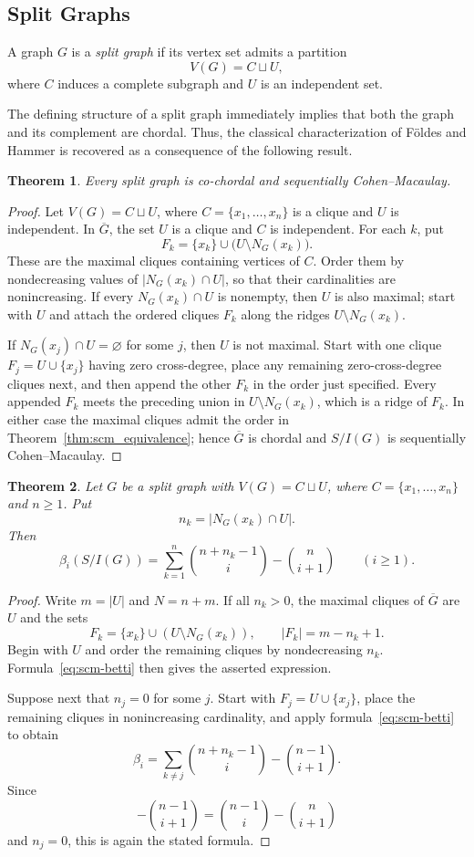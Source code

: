 \documentclass[12pt, reqno]{amsart}
\newtheorem{theorem}{Theorem}[section]
\theoremstyle{definition}
\numberwithin{equation}{section}
\begin{document}
	\subsection{Split Graphs}
	
	A graph $G$ is a \emph{split graph} if its vertex set admits a partition
	\[
	V(G)=C \sqcup U,
	\]
	where $C$ induces a complete subgraph and $U$ is an independent set.
	
	The defining structure of a split graph immediately implies that both the graph and its complement are chordal. Thus, the classical characterization of F\"oldes and Hammer \cite{foldes1977} is recovered as a consequence of the following result.
	
	\begin{theorem}\label{thm:split_is_scm}
Every split graph is co-chordal and sequentially Cohen--Macaulay.
\end{theorem}
\begin{proof}
Let $V(G)=C\sqcup U$, where $C=\{x_1,\ldots,x_n\}$ is a clique and $U$ is independent.  In $\overline G$, the set $U$ is a clique and $C$ is independent.  For each $k$, put
\[
F_k=\{x_k\}\cup\bigl(U\setminus N_G(x_k)\bigr).
\]
These are the maximal cliques containing vertices of $C$.  Order them by nondecreasing values of $|N_G(x_k)\cap U|$, so that their cardinalities are nonincreasing.  If every $N_G(x_k)\cap U$ is nonempty, then $U$ is also maximal; start with $U$ and attach the ordered cliques $F_k$ along the ridges $U\setminus N_G(x_k)$.

If $N_G(x_j)\cap U=\varnothing$ for some $j$, then $U$ is not maximal.  Start with one clique $F_j=U\cup\{x_j\}$ having zero cross-degree, place any remaining zero-cross-degree cliques next, and then append the other $F_k$ in the order just specified.  Every appended $F_k$ meets the preceding union in $U\setminus N_G(x_k)$, which is a ridge of $F_k$.  In either case the maximal cliques admit the order in Theorem~\ref{thm:scm_equivalence}; hence $\overline G$ is chordal and $S/I(G)$ is sequentially Cohen--Macaulay.
\end{proof}
	
	\begin{theorem}\label{thm:split_betti}
Let $G$ be a split graph with $V(G)=C\sqcup U$, where $C=\{x_1,\ldots,x_n\}$ and $n\ge1$.  Put
\[
n_k=|N_G(x_k)\cap U|.
\]
Then
\[
\beta_i(S/I(G))
=
\sum_{k=1}^{n}\binom{n+n_k-1}{i}
-
\binom{n}{i+1}
\qquad(i\ge1).
\]
\end{theorem}
\begin{proof}
Write $m=|U|$ and $N=n+m$.  If all $n_k>0$, the maximal cliques of $\overline G$ are $U$ and the sets
\[
F_k=\{x_k\}\cup(U\setminus N_G(x_k)),
\qquad |F_k|=m-n_k+1.
\]
Begin with $U$ and order the remaining cliques by nondecreasing $n_k$.  Formula~\eqref{eq:scm-betti} then gives the asserted expression.

Suppose next that $n_j=0$ for some $j$.  Start with $F_j=U\cup\{x_j\}$, place the remaining cliques in nonincreasing cardinality, and apply formula~\eqref{eq:scm-betti} to obtain
\[
\beta_i
=
\sum_{k\ne j}\binom{n+n_k-1}{i}
-
\binom{n-1}{i+1}.
\]
Since
\[
-\binom{n-1}{i+1}
=
\binom{n-1}{i}-\binom{n}{i+1}
\]
and $n_j=0$, this is again the stated formula.
\end{proof}
\end{document}
